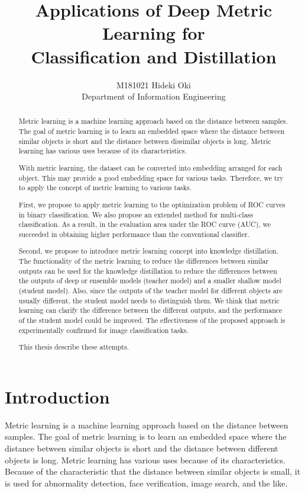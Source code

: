 \documentclass[twocolumn,10pt]{article}
\begin{document}
\title{Applications of Deep Metric Learning for \\ Classification and Distillation}
\author{M181021 Hideki Oki \\ Department of Information Engineering}
\date{\empty}

\maketitle

\begin{abstract}
Metric learning is a machine learning approach based on the distance between samples.
The goal of metric learning is to learn an embedded space where the distance between similar objects is short and the distance between dissimilar objects is long.
Metric learning has various uses because of its characteristics.

With metric learning, the dataset can be converted into embedding arranged for each object.
This may provide a good embedding space for various tasks.
Therefore, we try to apply the concept of metric learning to various tasks.

First, we propose to apply metric learning to the optimization problem of ROC curves in binary classification.
We also propose an extended method for multi-class classification.
As a result, in the evaluation area under the ROC curve (AUC), we succeeded in obtaining higher performance than the conventional classifier.

Second, we propose to introduce metric learning concept  into  knowledge  distillation.
The  functionality  of  the metric  learning  to  reduce  the  differences  between  similar outputs  can  be  used  for  the  knowledge  distillation  to  reduce the differences between the outputs of deep or ensemble models (teacher model) and a smaller shallow model (student model). 
Also, since  the  outputs  of  the  teacher  model for  different  objects  are  usually  different,  the  student  model needs  to  distinguish  them.  
We  think  that  metric  learning  can clarify  the  difference  between  the  different  outputs,  and  the performance of the student model could be improved.
The effectiveness of the proposed approach is experimentally confirmed for image classification tasks.

This thesis describe these attempts.
\end{abstract}

\thispagestyle{empty}
\section{Introduction}
Metric learning is a machine learning approach based on the distance between samples.
The goal of metric learning is to learn an embedded space where the distance between similar objects is short and the distance between different objects is long.
Metric learning has various uses because of its characteristics.
Because of the characteristic that the distance between similar objects is small, it is used for abnormality detection, face verification, image search, and the like.
\end{document}
